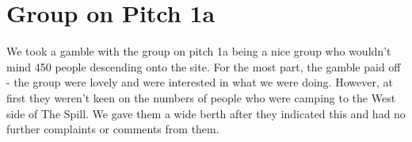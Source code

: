 \section{Group on Pitch 1a}
We took a gamble with the group on pitch 1a being a nice group who wouldn't mind 450 people descending onto the site. For the most part, the gamble paid off - the group were lovely and were interested in what we were doing. However, at first they weren't keen on the numbers of people who were camping to the West side of The Spill. We gave them a wide berth after they indicated this and had no further complaints or comments from them. 